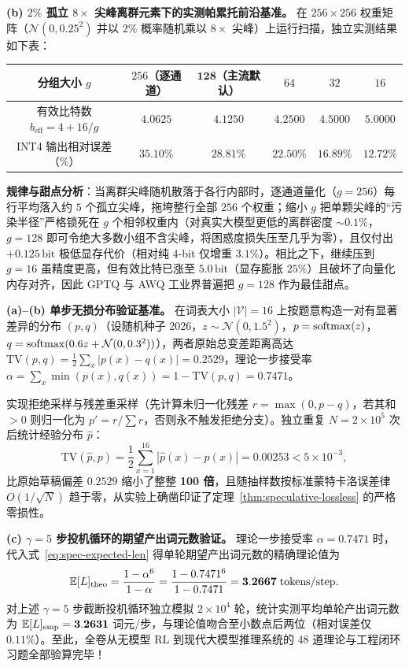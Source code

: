 \textbf{(b) $2\%$ 孤立 $8\times$ 尖峰离群元素下的实测帕累托前沿基准。} 在 $256 \times 256$ 权重矩阵（$\mathcal{N}(0, 0.25^2)$ 并以 $2\%$ 概率随机乘以 $8\times$ 尖峰）上运行扫描，独立实测结果如下表：
\begin{center}
\footnotesize
\begin{tabular}{cccccc}
\toprule
分组大小 $g$ & $256$（逐通道） & $\mathbf{128}$（主流默认） & $64$ & $32$ & $16$ \\
\midrule
有效比特数 $b_{\mathrm{eff}} = 4 + 16/g$ & $4.0625$ & $\mathbf{4.1250}$ & $4.2500$ & $4.5000$ & $5.0000$ \\
INT4 输出相对误差（$\%$） & $35.10\%$ & $\mathbf{28.81\%}$ & $22.50\%$ & $16.89\%$ & $12.72\%$ \\
\bottomrule
\end{tabular}
\end{center}
\textbf{规律与甜点分析}：当离群尖峰随机散落于各行内部时，逐通道量化（$g=256$）每行平均落入约 $5$ 个孤立尖峰，拖垮整行全部 $256$ 个权重；缩小 $g$ 把单颗尖峰的“污染半径”严格锁死在 $g$ 个相邻权重内（对真实大模型更低的离群密度 $\sim 0.1\%$，$g=128$ 即可令绝大多数小组不含尖峰，将困惑度损失压至几乎为零），且仅付出 $+0.125\,\mathrm{bit}$ 极低显存代价（相对纯 4-bit 仅增重 $3.1\%$）。相比之下，继续压到 $g = 16$ 虽精度更高，但有效比特已涨至 $5.0\,\mathrm{bit}$（显存膨胀 $25\%$）且破坏了向量化内存对齐，因此 GPTQ 与 AWQ 工业界普遍把 $g = 128$ 作为最佳甜点。


\textbf{(a)--(b) 单步无损分布验证基准。} 在词表大小 $|\mathcal{V}| = 16$ 上按题意构造一对有显著差异的分布 $(p, q)$（设随机种子 2026，$z \sim \mathcal{N}(0, 1.5^2)$，$p = \operatorname{softmax}(z)$，$q = \operatorname{softmax}(0.6z + \mathcal{N}(0, 0.3^2))$），两者原始总变差距离高达 $\mathrm{TV}(p, q) = \frac{1}{2}\sum_x |p(x) - q(x)| = \mathbf{0.2529}$，理论一步接受率 $\alpha = \sum_x \min(p(x), q(x)) = 1 - \mathrm{TV}(p, q) = \mathbf{0.7471}$。

实现拒绝采样与残差重采样（先计算未归一化残差 $r = \max(0, p - q)$，若其和 $> 0$ 则归一化为 $p' = r / \sum r$，否则永不触发拒绝分支）。独立重复 $N = 2 \times 10^5$ 次后统计经验分布 $\hat{p}$：
\[
  \mathrm{TV}(\hat{p}, p) = \frac{1}{2}\sum_{x=1}^{16} |\hat{p}(x) - p(x)| = \mathbf{0.00253} < 5 \times 10^{-3},
\]
比原始草稿偏差 $0.2529$ 缩小了整整 \textbf{100 倍}，且随抽样数按标准蒙特卡洛误差律 $O(1/\sqrt{N})$ 趋于零，从实验上确凿印证了定理~\ref{thm:speculative-lossless} 的严格零损性。

\textbf{(c) $\gamma = 5$ 步投机循环的期望产出词元数验证。} 理论一步接受率 $\alpha = 0.7471$ 时，代入式~\eqref{eq:spec-expected-len} 得单轮期望产出词元数的精确理论值为
\[
  \mathbb{E}[L]_{\mathrm{theo}} = \frac{1 - \alpha^6}{1 - \alpha} = \frac{1 - 0.7471^6}{1 - 0.7471} = \mathbf{3.2667}\;\text{tokens/step}.
\]
对上述 $\gamma = 5$ 步截断投机循环独立模拟 $2 \times 10^4$ 轮，统计实测平均单轮产出词元数为 $\mathbb{E}[L]_{\mathrm{emp}} = \mathbf{3.2631}$ 词元/步，与理论值吻合至小数点后两位（相对误差仅 $0.11\%$）。至此，全卷从无模型 RL 到现代大模型推理系统的 48 道理论与工程闭环习题全部验算完毕！
